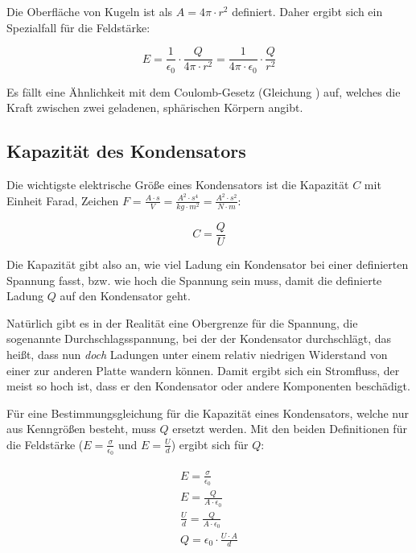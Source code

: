 Die Oberfläche von Kugeln ist als $A=4\pi \cdot r^2$ definiert. Daher ergibt sich ein Spezialfall für die Feldstärke:

\begin{equation} \label{eq:feldstaerke_kugel}
	E = \frac{1}{\epsilon_0} \cdot \frac{Q}{4\pi \cdot r^2} = \frac{1}{4\pi \cdot \epsilon_0} \cdot \frac{Q}{r^2}
\end{equation}

Es fällt eine Ähnlichkeit mit dem Coulomb-Gesetz (Gleichung ) auf, welches die Kraft zwischen zwei geladenen, sphärischen Körpern angibt.


\subsection{Kapazität des Kondensators}

Die wichtigste elektrische Größe eines Kondensators ist die Kapazität $C$ mit Einheit \glqq Farad\grqq{}, Zeichen $F = \frac{A \cdot s}{V} = \frac{A^2 \cdot s^4}{kg \cdot m^2} = \frac{A^2 \cdot s^2}{N \cdot m}$:

\begin{equation} \label{eq:kapazitaet}
	C = \frac{Q}{U}
\end{equation}

Die Kapazität gibt also an, wie viel Ladung ein Kondensator bei einer definierten Spannung fasst, bzw. wie hoch die Spannung sein muss, damit die definierte Ladung $Q$ auf den Kondensator \glqq geht\grqq .

\begin{NiceToKnow}
Natürlich gibt es in der Realität eine Obergrenze für die Spannung, die sogenannte \glqq Durchschlagsspannung\grqq , bei der der Kondensator durchschlägt, das heißt, dass nun \emph{doch} Ladungen unter einem relativ niedrigen Widerstand von einer zur anderen Platte wandern können. Damit ergibt sich ein Stromfluss, der meist so hoch ist, dass er den Kondensator oder andere Komponenten beschädigt.
\end{NiceToKnow}

Für eine Bestimmungsgleichung für die Kapazität eines Kondensators, welche nur aus Kenngrößen besteht, muss $Q$ ersetzt werden. Mit den beiden Definitionen für die Feldstärke ($E = \frac{\sigma}{\epsilon_0}$ und $E=\frac{U}{d}$) ergibt sich für $Q$:

\begin{align}
\begin{split}
	E = \frac{\sigma}{\epsilon_0} \\
	E = \frac{Q}{A \cdot \epsilon_0} \\
	\frac{U}{d} = \frac{Q}{A \cdot \epsilon_0} \\
	Q = \epsilon_0 \cdot \frac{U \cdot A}{d}
\end{split}
\end{align}


